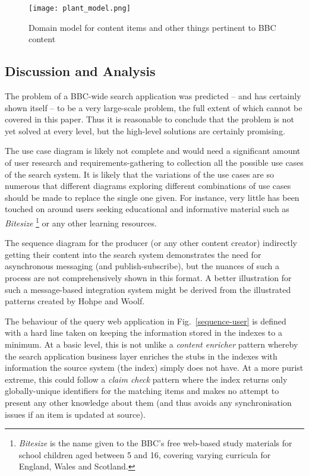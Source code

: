 \documentclass{llncs}
\begin{document}
\begin{figure}
  \begin{center}
    \texttt{[image: plant\_model.png]}
  \end{center}
  \caption{Domain model for content items and other things pertinent to BBC content\label{model}}
\end{figure}

\subsection{Discussion and Analysis}
\label{appraisal}

The problem of
a BBC-wide search application was predicted --
and has certainly shown itself -- to be a very large-scale problem, the
full extent of which cannot be covered in this paper. Thus it
is reasonable to conclude that the problem is not yet solved
at every level, but the high-level solutions are certainly promising.

The use case diagram is likely not complete and would need
a significant amount of user research and requirements-gathering
to collection all the possible use cases of the search system. It
is likely that the variations of the use cases are so numerous
that different diagrams exploring different combinations of use
cases should be made to replace the single one given. For instance,
very little has been touched on around users seeking educational
and informative material such as \emph{Bitesize}
\footnote{\emph{Bitesize} is the name given to the BBC's free web-based
study materials for school children aged between
5 and 16, covering varying curricula for England, Wales and Scotland.}
or any other learning resources.

The sequence diagram for the producer (or any other content creator)
indirectly getting their content into the search system demonstrates
the need for asynchronous messaging (and publish-subscribe), but
the nuances of such a process are not comprehensively shown in
this format. A better illustration for such a message-based integration
system might be derived from the illustrated patterns created
by Hohpe and Woolf\cite{hohpe2004enterprise}.

The behaviour of the query web application in Fig.~\ref{sequence-user}
is defined with a hard line
taken on keeping the information stored in the indexes to a minimum.
At a basic level, this is not unlike a \emph{content enricher} pattern
\cite{hohpe2004enterprise} whereby the search application
business layer enriches the stubs in the indexes with information
the source system (the index) simply does not have. At a more purist
extreme, this could follow a \emph{claim check} pattern where
the index returns only globally-unique identifiers for the matching
items and makes no attempt to present any other knowledge about them
(and thus avoids any synchronisation issues if an item is updated at
source).
\end{document}
